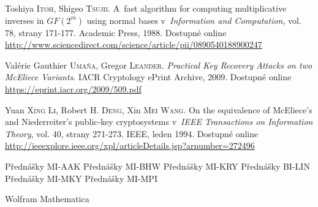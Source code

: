 \documentclass[thesis=M,czech,hidelinks]{FITthesis}[2012/06/26]
\newcommand{\0}{{\textcolor[gray]{0.80}{0}}}
\begin{document}
\begin{thebibliography}{99}
        Toshiya \textsc{Itoh}, Shigeo \textsc{Tsujii}. A~fast algorithm for
        computing multiplicative inverses in $GF(2^m)$ using normal bases
        v~\emph{Information and Computation}, vol. 78, strany 171-177. Academic
        Press, 1988.  Dostupné online
        \url{http://www.sciencedirect.com/science/article/pii/0890540188900247}

        Valérie Gauthier \textsc{Umaña}, Gregor \textsc{Leander}.
        \emph{Practical Key Recovery Attacks on two McEliece Variants}.
        IACR Cryptology ePrint Archive, 2009.  Dostupné online
        \url{https://eprint.iacr.org/2009/509.pdf}

        Yuan \textsc{Xing Li}, Robert H. \textsc{Deng}, Xin \textsc{Mei Wang}.
        On the equivalence of McEliece's and Niederreiter's public-key
        cryptosystems v~\emph{IEEE Transactions on Information Theory}, vol. 40,
        strany 271-273. IEEE, leden 1994. Dostupné online
        \url{http://ieeexplore.ieee.org/xpl/articleDetails.jsp?arnumber=272496}

     Přednášky MI-AAK
     Přednášky MI-BHW
     Přednášky MI-KRY
     Přednášky BI-LIN
     Přednášky MI-MKY
     Přednášky MI-MPI

     Wolfram Mathematica
\end{thebibliography}

\appendix

\end{document}
